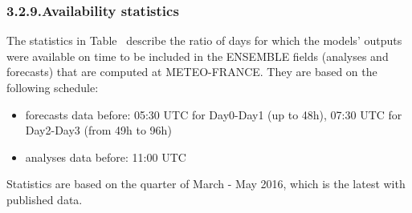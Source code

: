 \documentclass[9pt]{report}
\begin{document}
\subsubsection{3.2.9.\hspace*{0.5em}Availability statistics}\label{sec-availability-statistics}%

\noindent{}The statistics in Table~ describe the ratio of days for which the models' outputs were available on time to be included in the ENSEMBLE fields (analyses and forecasts) that are computed at METEO-FRANCE. 
They are based on the following schedule:%

\begin{itemize}[noitemsep,topsep=\mdcompacttopsep]%

\item{}forecasts data before: 05:30 UTC for Day0-Day1 (up to 48h), 07:30 UTC for Day2-Day3 (from 49h to 96h)%

\item{}analyses data before: 11:00 UTC%
\end{itemize}%

\noindent{}Statistics are based on the quarter of March - May 2016, which is the latest with published data.%
\end{document}
